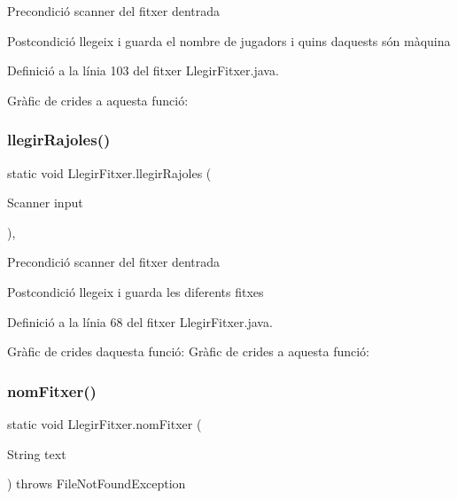 \begin{DoxyPrecond}{Precondició}
scanner del fitxer d\textquotesingle{}entrada 
\end{DoxyPrecond}
\begin{DoxyPostcond}{Postcondició}
llegeix i guarda el nombre de jugadors i quins d\textquotesingle{}aquests són màquina 
\end{DoxyPostcond}


Definició a la línia 103 del fitxer Llegir\+Fitxer.\+java.

Gràfic de crides a aquesta funció\+:
\mbox{\label{class_llegir_fitxer_ac73d2ac3cbe198bd2ab5c6e1f5b4ead2}} 
\subsubsection{\texorpdfstring{llegir\+Rajoles()}{llegirRajoles()}}
{\footnotesize\ttfamily static void Llegir\+Fitxer.\+llegir\+Rajoles (\begin{DoxyParamCaption}\item[{Scanner}]{input }\end{DoxyParamCaption})\hspace{0.3cm}{\ttfamily [static]}, {\ttfamily [private]}}

\begin{DoxyPrecond}{Precondició}
scanner del fitxer d\textquotesingle{}entrada 
\end{DoxyPrecond}
\begin{DoxyPostcond}{Postcondició}
llegeix i guarda les diferents fitxes 
\end{DoxyPostcond}


Definició a la línia 68 del fitxer Llegir\+Fitxer.\+java.

Gràfic de crides d\textquotesingle{}aquesta funció\+:
Gràfic de crides a aquesta funció\+:
\mbox{\label{class_llegir_fitxer_a68f9ae473ab16632116b8c13ed16fff5}} 
\subsubsection{\texorpdfstring{nom\+Fitxer()}{nomFitxer()}}
{\footnotesize\ttfamily static void Llegir\+Fitxer.\+nom\+Fitxer (\begin{DoxyParamCaption}\item[{String}]{text }\end{DoxyParamCaption}) throws File\+Not\+Found\+Exception\hspace{0.3cm}{\ttfamily [static]}}


